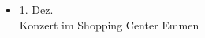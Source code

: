 \begin{history}
\begin{itemize}
        \item[]1. Dez.\\
        Konzert im Shopping Center Emmen

    \end{itemize}

\end{history}

